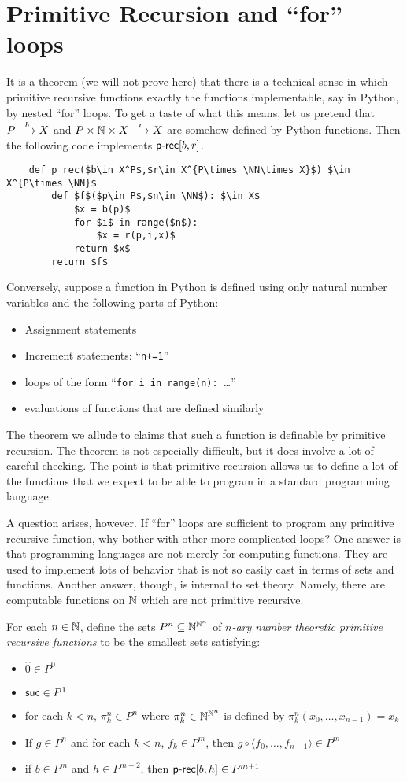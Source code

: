 \section{Primitive Recursion and ``for'' loops}

It is a theorem (we will not prove here) that there is a technical sense in which primitive recursive functions exactly the functions  implementable, say in Python, by nested ``for'' loops. To get a taste of what this means, let us pretend that $\sfromto bPX$ and $\sfromto r{P\times \NN\times X}X$ are somehow defined by Python functions. Then the following code implements $\primrec[b,r]$.

\begin{lstlisting}
	def p_rec($b\in X^P$,$r\in X^{P\times \NN\times X}$) $\in X^{P\times \NN}$
		def $f$($p\in P$,$n\in \NN$): $\in X$
			$x = b(p)$
			for $i$ in range($n$):
				$x = r(p,i,x)$
			return $x$
		return $f$
\end{lstlisting}

Conversely, suppose a function in Python is defined using only natural number variables and the following parts of Python:
\begin{itemize}
	\item Assignment statements
	\item Increment statements: ``\lstinline!n+=1!''
	\item loops of the form ``\lstinline!for i in range(n): !\ldots''
	\item evaluations of functions that are defined similarly
\end{itemize}
The theorem we allude to claims that such a function is definable by primitive recursion. The theorem is not especially difficult, but it does involve a lot of careful checking. The point is that primitive recursion allows us to define a lot of the functions that we expect to be able to program in a standard programming language.

A question arises, however. If ``for'' loops are sufficient to program any primitive recursive function, why bother with other more complicated loops?
One answer is that programming languages are not merely for computing functions. They are used to implement lots of behavior that is not so easily cast in terms of sets and functions. Another answer, though, is internal to set theory. Namely, there are computable functions on $\NN$ which are not primitive recursive.

For each $n\in \NN$, define the sets $P^n\subseteq \NN^{\NN^n}$ of \emph{$n$-ary number theoretic primitive recursive functions} to be the smallest sets satisfying:
\begin{itemize}
	\item $\hat{0} \in P^0$
	\item $\suc\in P^1$
	\item for each $k<n$, $\pi^n_k\in P^n$ where $\pi^n_k\in \NN^{\NN^n}$ is defined by $\pi^n_k(x_0,\dotsc, x_{n-1}) = x_k$
	\item If $g\in P^n$ and for each $k<n$, $f_k\in P^m$, then $g\circ \langle f_0,\dotsc, f_{n-1}\rangle \in P^m$
	\item if $b\in P^m$ and $h\in P^{m+2}$, then $\primrec[b,h]\in P^{m+1}$
\end{itemize}


